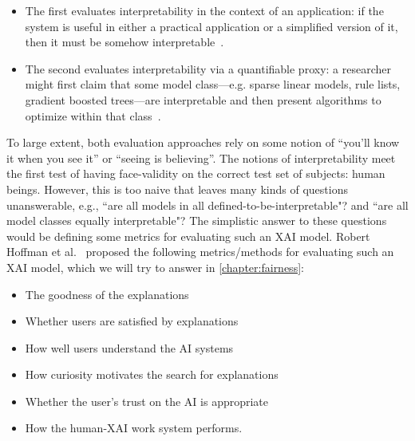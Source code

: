 \begin{itemize}[noitemsep]
    \item The first evaluates interpretability in the context of an application: if the system is useful in either a practical application or a simplified version of it, then it must be somehow interpretable~\cite{bhatt2020explainable}. 
    \item The second evaluates interpretability via a quantifiable proxy: a researcher might first claim that some model class—e.g. sparse linear models, rule lists, gradient boosted  trees—are interpretable and then present algorithms to optimize within that class~\cite{miller2018explanation}. 
\end{itemize}

\hspace*{3.5mm} To large extent, both evaluation approaches rely on some notion of ``you’ll know it when you see it'' or ``seeing is believing''. The notions of interpretability meet the first test of having face-validity on the correct test set of subjects: human beings. However, this is too naive that leaves many kinds of questions unanswerable, e.g., ``are all models in all defined-to-be-interpretable"? and ``are all model classes equally interpretable"? The simplistic answer to these questions would be defining some metrics for evaluating such an XAI model. Robert Hoffman et al.~\cite{hoffman2018metrics} proposed the following metrics/methods for evaluating such an XAI model, which we will try to answer in \cref{chapter:fairness}:

\begin{itemize}[noitemsep]
    \item The goodness of the explanations
    \item Whether users are satisfied by explanations
    \item How well users understand the AI systems
    \item How curiosity motivates the search for explanations
    \item Whether the user's trust on the AI is appropriate
    \item How the human-XAI work system performs.
\end{itemize}
\fi \fi 

